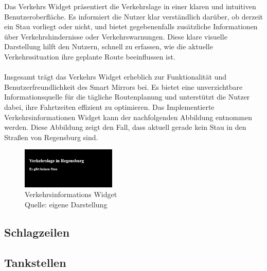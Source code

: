 \noindent
Das Verkehrs Widget präsentiert die Verkehrslage in einer klaren und intuitiven Benutzeroberfläche. Es informiert die Nutzer klar verständlich darüber, ob derzeit ein Stau vorliegt oder nicht, und bietet gegebenenfalls zusätzliche Informationen über Verkehrshindernisse oder Verkehrswarnungen. Diese klare visuelle Darstellung hilft den Nutzern, schnell zu erfassen, wie die aktuelle Verkehrssituation ihre geplante Route beeinflussen ist. \\ \\
\noindent
Insgesamt trägt das Verkehrs Widget erheblich zur Funktionalität und Benutzerfreundlichkeit des Smart Mirrors bei. Es bietet eine unverzichtbare Informationsquelle für die tägliche Routenplanung und unterstützt die Nutzer dabei, ihre Fahrtzeiten effizient zu optimieren. Das Implementierte Verkehrsinformationen Widget kann der nachfolgenden Abbildung entnommen werden. Diese Abbildung zeigt den Fall, dass aktuell gerade kein Stau  in den Straßen von Regensburg sind.

\begin{figure}[h]
    \centering
    \includegraphics[width=0.4\textwidth]{pictures/traffic_widget.png}
  \captionsetup{justification=centering, labelformat=simple, singlelinecheck=false}
    \caption{Verkehrsinformations Widget\\ Quelle: eigene Darstellung}
\end{figure}

\subsection{Schlagzeilen}
\subsection{Tankstellen}


